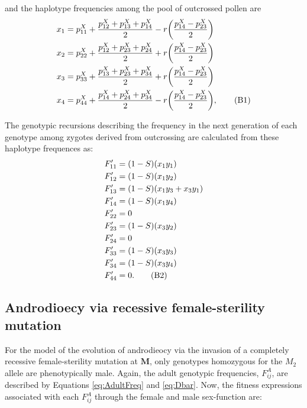 \documentclass{article}
\newcommand\numberthis{\addtocounter{equation}{1}\tag{\theequation}}
\begin{document}
\noindent and the haplotype frequencies among the pool of outcrossed pollen are
\begin{align*} 
    x_{1} &= p^X_{11} + \frac{p^X_{12} + p^X_{13} + p^X_{14}}{2} - r \bigg( \frac{p^X_{14} - p^X_{23}}{2} \bigg)  \\
    x_{2} &= p^X_{22} + \frac{p^X_{12} + p^X_{23} + p^X_{24}}{2} + r \bigg( \frac{p^X_{14} - p^X_{23}}{2} \bigg)  \\
    x_{3} &= p^X_{33} + \frac{p^X_{13} + p^X_{23} + p^X_{34}}{2} + r \bigg( \frac{p^X_{14} - p^X_{23}}{2} \bigg)  \\
    x_{4} &= p^X_{44} + \frac{p^X_{14} + p^X_{24} + p^X_{34}}{2} - r \bigg( \frac{p^X_{14} - p^X_{23}}{2} \bigg),  \numberthis
\end{align*}

\noindent The genotypic recursions describing the frequency in the next generation of each genotype among zygotes derived from outcrossing are calculated from these haplotype frequences as:
\begin{align*} 
    F'_{11} &= (1 - S) (x_1 y_1)  \\
    F'_{12} &= (1 - S) (x_1 y_2)  \\
    F'_{13} &= (1 - S) (x_1 y_3 + x_3 y_1)  \\
    F'_{14} &= (1 - S) (x_1 y_4)  \\
    F'_{22} &= 0 \\
    F'_{23} &= (1 - S) (x_3 y_2)  \\
    F'_{24} &= 0 \\
    F'_{33} &= (1 - S) (x_3 y_3)  \\
    F'_{34} &= (1 - S) (x_3 y_4)  \\
    F'_{44} &= 0. \numberthis
\end{align*}




\newpage{}
\subsection*{Androdioecy via recessive female-sterility mutation}

For the model of the evolution of androdieocy via the invasion of a completely recessive female-sterility mutation at $\mathbf{M}$, only genotypes homozygous for the $M_2$ allele are phenotypically male. Again, the adult genotypic frequencies, $F^A_{ij}$, are described by Equations \ref{eq:AdultFreq} and \ref{eq:Dbar}. Now, the fitness expressions associated with each $F^A_{ij}$ through the female and male sex-function are:
\end{document}
